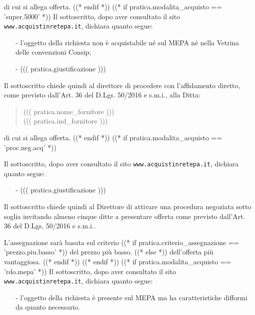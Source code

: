 \documentclass[a4paper,12pt]{letter}
\begin{document}
di cui si allega offerta.
((* endif *))
((* if pratica.modalita_acquisto == 'super.5000' *))
Il sottoscritto, dopo aver consultato il sito {\tt www.acquistinretepa.it},
dichiara quanto segue:

\begin{itemize}
\item[-] l'oggetto della richiesta non \`e acquistabile n\'e sul MEPA n\'e
	 nella Vetrina delle convenzioni Consip;
\item[-] ((( pratica.giustificazione )))
\end{itemize}
Il sottoscritto chiede quindi al direttore di procedere con l'affidamento diretto,
come previsto dall'Art. 36 del D.Lgs. 50/2016 e s.m.i., alla Ditta: 
\begin{quote}
((( pratica.nome_fornitore )))\\
((( pratica.ind_fornitore )))
\end{quote}

di cui si allega offerta.
((* endif *))
((* if pratica.modalita_acquisto == 'proc.neg.acq' *))

Il sottoscritto, dopo aver consultato il sito {\tt www.acquistinretepa.it},
dichiara quanto segue:

\begin{itemize}
\item[-] ((( pratica.giustificazione )))
\end{itemize}

Il sottoscritto chiede quindi al Direttore di attivare una procedura negoziata
sotto soglia invitando almeno cinque ditte a presentare offerta come previsto
dall'Art. 36 del D.Lgs. 50/2016 e s.m.i..

L'assegnazione sar\`a basata sul criterio %
   ((* if pratica.criterio_assegnazione == 'prezzo.piu.basso' *)) %
del prezzo pi\`u basso.
   ((* else *)) %
dell'offerta pi\`u vantaggiosa.
   ((* endif *))
((* endif *))
((* if pratica.modalita_acquisto == 'rdo.mepa' *))
Il sottoscritto, dopo aver consultato il sito {\tt www.acquistinretepa.it},
dichiara quanto segue:

\begin{itemize}
\item[-] l'oggetto della richiesta \`e presente sul MEPA ma ha caratteristiche difformi
da quanto necessario.
\end{itemize}
\end{document}
